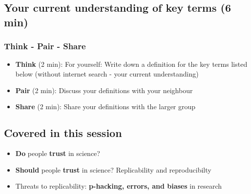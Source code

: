 \documentclass[
  letterpaper,
  DIV=11,
  numbers=noendperiod]{scrartcl}
\providecommand{\tightlist}{%
  \setlength{\itemsep}{0pt}\setlength{\parskip}{0pt}}
\begin{document}
\subsection{\texorpdfstring{ Your current
understanding of key terms (6
min)}{ Your current understanding of key terms (6 min)}}\label{b58fc729-690b-4000-b19f-365a4093b2ff7b7b3c2066612070656f706c652d67726f75702073697a653d3178203e7d7d-your-current-understanding-of-key-terms-6-min}

\subsubsection{Think - Pair - Share}\label{think---pair---share}

\begin{itemize}
\tightlist
\item
  \textbf{Think} (2 min): For yourself: Write down a definition for the
  key terms listed below {(without internet search - your current
  understanding)}
\item
  \textbf{Pair} (2 min): Discuss your definitions with your neighbour
\item
  \textbf{Share} (2 min): Share your definitions with the larger group
\end{itemize}

\subsection{Covered in this session}\label{covered-in-this-session}

\begin{itemize}
\tightlist
\item
  \textbf{Do} people \textbf{trust} in science?
\item
  \textbf{Should} people \textbf{trust} in science? Replicability and
  reproducibilty
\item
  Threats to replicability: \textbf{p-hacking, errors, and biases} in
  research
\end{itemize}
\end{document}
